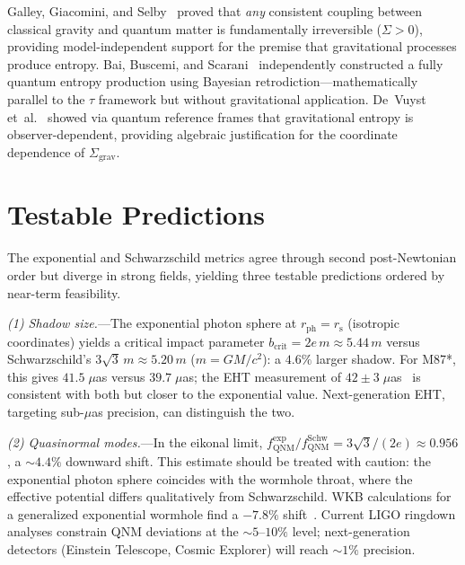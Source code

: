\documentclass[prl,twocolumn,superscriptaddress,floatfix,nofootinbib]{revtex4-2}
\newcommand{\tauasym}{\tau}
\newcommand{\rs}{r_{\mathrm{s}}}
\newcommand{\Sgrav}{\Sigma_{\mathrm{grav}}}
\begin{document}
Galley, Giacomini, and Selby~\cite{GalleyGiacominiSelby2023}
proved that \emph{any} consistent coupling between classical
gravity and quantum matter is fundamentally irreversible
($\Sigma > 0$), providing model-independent support for the
premise that gravitational processes produce entropy.
Bai, Buscemi, and Scarani~\cite{BaiBuscemiScarani2024}
independently constructed a fully quantum entropy production
using Bayesian retrodiction---mathematically parallel to the
$\tauasym$ framework but without gravitational application.
De~Vuyst et~al.~\cite{DeVuyst2025} showed via quantum
reference frames that gravitational entropy is
observer-dependent, providing algebraic justification for the
coordinate dependence of $\Sgrav$.

\section{Testable Predictions}
\label{sec:predictions}

The exponential and Schwarzschild metrics agree through
second post-Newtonian order but diverge in strong
fields, yielding three testable predictions ordered by
near-term feasibility.

\emph{(1) Shadow size.}---The exponential photon sphere
at $r_{\text{ph}} = \rs$ (isotropic coordinates)
yields a critical impact parameter
$b_{\text{crit}} = 2e\, m \approx 5.44\, m$
versus Schwarzschild's $3\sqrt{3}\,m \approx 5.20\,m$
($m = GM/c^2$): a $4.6\%$ larger shadow.
For M87*, this gives $41.5\;\mu$as versus
$39.7\;\mu$as; the EHT measurement of
$42 \pm 3\;\mu$as~\cite{EHT2019} is consistent with
both but closer to the exponential value.
Next-generation EHT, targeting sub-$\mu$as precision,
can distinguish the two.

\emph{(2) Quasinormal modes.}---In the eikonal limit,
$f_{\text{QNM}}^{\text{exp}}/f_{\text{QNM}}^{\text{Schw}}
= 3\sqrt{3}/(2e) \approx 0.956$,
a $\sim 4.4\%$ downward shift.
This estimate should be treated with caution: the
exponential photon sphere coincides with the wormhole
throat, where the effective potential differs
qualitatively from Schwarzschild.
WKB calculations for a generalized exponential
wormhole find a $-7.8\%$ shift~\cite{NathSarma2024}.
Current LIGO ringdown analyses constrain QNM deviations
at the $\sim 5$--$10\%$ level; next-generation
detectors (Einstein Telescope, Cosmic Explorer) will
reach $\sim 1\%$ precision.
\end{document}
